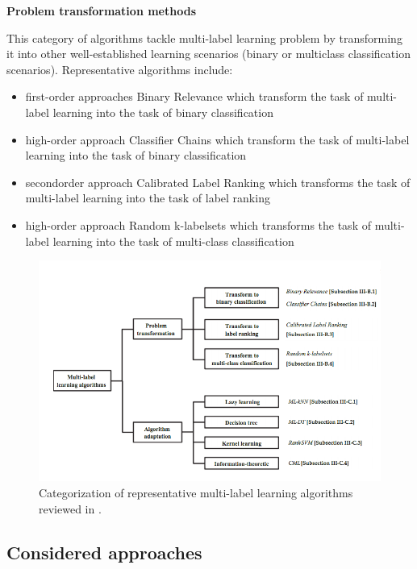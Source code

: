 \textbf{Problem transformation methods}

This category of algorithms tackle multi-label learning problem by transforming it into other well-established learning scenarios (binary or multiclass classification scenarios). 
Representative algorithms include:
\begin{itemize}
 \item first-order approaches Binary Relevance which transform the task of multi-label learning into the task of binary classification 
 \item high-order approach Classifier Chains which transform the task of multi-label learning into the task of binary classification 
 \item secondorder approach Calibrated Label Ranking which transforms the task of multi-label learning into the task of label ranking
 \item high-order approach Random k-labelsets which transforms the task of multi-label learning into the task of multi-class classification
\end{itemize}

\begin{figure}[H]
\centering
\includegraphics[scale=0.6]{./images/machine-learning/multi-label-approaches.png}
\caption{Categorization of representative multi-label learning algorithms reviewed in \cite[this paper]{MultilabelReview}.}
\label{fig:multilabelOverview}
\end{figure}


\subsection{Considered approaches}

